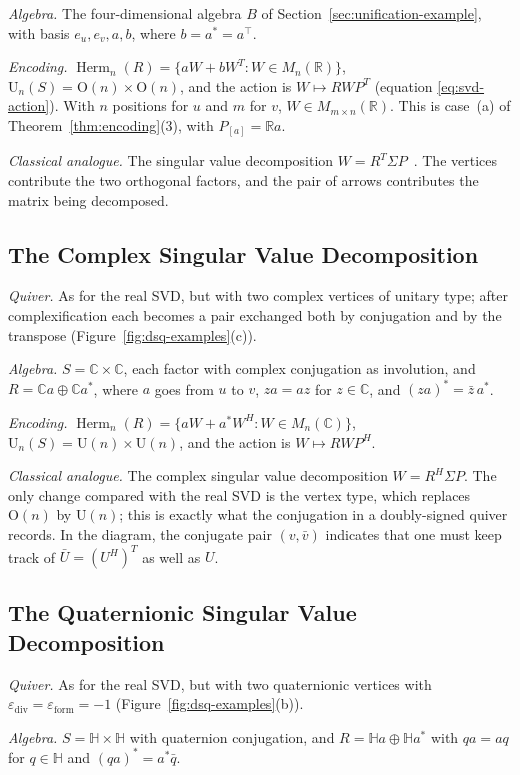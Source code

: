 \documentclass[12pt, a4paper]{report}
\theoremstyle{plain}
\theoremstyle{definition}
\theoremstyle{remark}
\theoremstyle{plain}
\newcommand{\epsilondiv}{\varepsilon_{\mathrm{div}}}
\newcommand{\epsilonform}{\varepsilon_{\mathrm{form}}}
\newcommand{\RR}{\mathbb{R}}
\newcommand{\CC}{\mathbb{C}}
\newcommand{\HH}{\mathbb{H}}
\newcommand{\Or}{\mathrm{O}}
\newcommand{\Un}{\mathrm{U}}
\newcommand{\Herm}{\operatorname{Herm}}
\begin{document}
\emph{Algebra.} The four-dimensional algebra $B$ of Section~\ref{sec:unification-example}, with basis $e_u,e_v,a,b$, where $b=a^*=a^{\top}$.

\emph{Encoding.} $\Herm_n(R)=\{aW+bW^T:W\in M_n(\RR)\}$, $\Un_n(S)=\Or(n)\times\Or(n)$, and the action is $W\mapsto RWP^T$ (equation \eqref{eq:svd-action}). With $n$ positions for $u$ and $m$ for $v$, $W\in M_{m\times n}(\RR)$. This is case~(a) of Theorem~\ref{thm:encoding}(3), with $P_{[a]}=\RR a$.

\emph{Classical analogue.} The singular value decomposition $W=R^T\Sigma P$~\cite{GolubVanLoan2013}. The vertices contribute the two orthogonal factors, and the pair of arrows contributes the matrix being decomposed.

\subsection{The Complex Singular Value Decomposition}
\label{subsec:cat-complex-svd}
\emph{Quiver.} As for the real SVD, but with two complex vertices of unitary type; after complexification each becomes a pair exchanged both by conjugation and by the transpose (Figure~\ref{fig:dsq-examples}(c)).

\emph{Algebra.} $S=\CC\times\CC$, each factor with complex conjugation as involution, and $R=\CC a\oplus\CC a^*$, where $a$ goes from $u$ to $v$, $za=az$ for $z\in\CC$, and $(za)^*=\bar z\,a^*$.

\emph{Encoding.} $\Herm_n(R)=\{aW+a^*W^H:W\in M_n(\CC)\}$, $\Un_n(S)=\Un(n)\times\Un(n)$, and the action is $W\mapsto RWP^H$.

\emph{Classical analogue.} The complex singular value decomposition $W=R^H\Sigma P$. The only change compared with the real SVD is the vertex type, which replaces $\Or(n)$ by $\Un(n)$; this is exactly what the conjugation in a doubly-signed quiver records. In the diagram, the conjugate pair $(v,\bar v)$ indicates that one must keep track of $\bar U=(U^H)^T$ as well as $U$.

\subsection{The Quaternionic Singular Value Decomposition}
\label{subsec:cat-quaternion-svd}
\emph{Quiver.} As for the real SVD, but with two quaternionic vertices with $\epsilondiv=\epsilonform=-1$ (Figure~\ref{fig:dsq-examples}(b)).

\emph{Algebra.} $S=\HH\times\HH$ with quaternion conjugation, and $R=\HH a\oplus\HH a^*$ with $qa=aq$ for $q\in\HH$ and $(qa)^*=a^*\bar q$.
\end{document}
